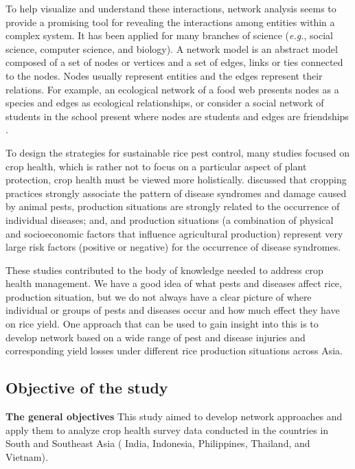 To help visualize and understand these interactions, network analysis seems to provide a promising tool for revealing the interactions among entities within a complex system. It has been applied for many branches of science (\textit{e.g.}, social science, computer science, and biology). A network model is an abstract model composed of a set of nodes or vertices and a set of edges, links or ties connected to the nodes. Nodes usually represent entities and the edges represent their relations. For example, an ecological network of a food web presents nodes as a species \citep{Krause_2003_Compartments} and edges as ecological relationships, or consider a social network of students in the school present where nodes are students and edges are friendships \citep{Moody_2001_Race}.

To design the strategies for sustainable  rice pest control, many studies focused on crop health, which is rather not to focus on a particular aspect of plant protection, crop health must be viewed more holistically. \citet{Savary_1995_Use,Savary_2000_Quantification,Savary_2005_Multiple} discussed that cropping practices strongly associate the pattern of disease syndromes and damage caused by animal pests, production situations are strongly related to the occurrence of  individual diseases; and, and production situations (a combination of physical and socioeconomic factors that influence agricultural production) represent very large risk factors (positive or negative) for the occurrence of disease syndromes. 

These studies contributed to the body of knowledge needed to address crop health management. We have a good idea of what pests and diseases affect rice, production situation, but we do not always have a clear picture of where individual or groups of pests and diseases occur and how much effect they have on rice yield. One approach that can be used to gain insight into this is to develop network based on a wide range of pest and disease injuries and corresponding yield losses under different rice production situations across Asia. 

\subsection{Objective of the study}

\textbf{The general objectives}
This study aimed to develop network approaches and apply them to analyze crop health survey data conducted in the countries in South and Southeast Asia ( India, Indonesia, Philippines, Thailand, and Vietnam). 

